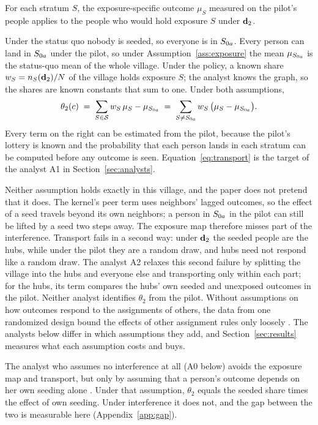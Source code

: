 \begin{assumption}[Transport]\label{ass:transport}
For each stratum $S$, the exposure-specific outcome $\mu_S$ measured on the
pilot's people applies to the people who would hold exposure $S$ under $\mathbf{d}_2$.
\end{assumption}

Under the status quo nobody is seeded, so everyone is in $S_{0a}$. Every person can
land in $S_{0a}$ under the pilot, so under Assumption~\ref{ass:exposure} the mean
$\mu_{S_{0a}}$ is the status-quo mean of the whole village. Under the policy, a known
share $w_S=n_S(\mathbf{d}_2)/N$ of the village holds exposure $S$; the analyst knows the
graph, so the shares are known constants that sum to one. Under both assumptions,
\begin{equation}\label{eq:transport}
  \theta_2(c)
  \;=\;\sum_{S\in\mathcal{S}} w_S\,\mu_S-\mu_{S_{0a}}
  \;=\;\sum_{S\neq S_{0a}} w_S\,\bigl(\mu_S-\mu_{S_{0a}}\bigr).
\end{equation}
Every term on the right can be estimated from the pilot, because the pilot's
lottery is known and the probability that each person lands in each stratum can
be computed before any outcome is seen. Equation~\eqref{eq:transport} is the
target of the analyst A1 in Section~\ref{sec:analysts}.

Neither assumption holds exactly in this village, and the paper does not pretend
that it does. The kernel's peer term uses neighbors' lagged outcomes, so the
effect of a seed travels beyond its own neighbors; a person in $S_{0a}$ in the pilot
can still be lifted by a seed two steps away. The exposure map therefore misses
part of the interference. Transport fails in a second way: under $\mathbf{d}_2$ the
seeded people are the hubs, while under the pilot they are a random draw, and
hubs need not respond like a random draw. The analyst A2 relaxes this second
failure by splitting the village into the hubs and everyone else and transporting
only within each part; for the hubs, its term compares the hubs' own seeded and
unexposed outcomes in the pilot. Neither analyst identifies $\theta_2$ from the
pilot.
Without assumptions on how outcomes respond to the assignments of others, the
data from one randomized design bound the effects of other assignment rules only
loosely \citep{manski2013}. The analysts below differ in which assumptions they
add, and Section~\ref{sec:results} measures what each assumption costs and buys.

The analyst who assumes no interference at all (A0 below) avoids the exposure map
and transport, but only by assuming that a person's outcome depends on her own
seeding alone \citep{rubin1980}. Under that assumption, $\theta_2$ equals the
seeded share times the effect of own seeding. Under interference it does not, and
the gap between the two is measurable here (Appendix~\ref{app:gap}).
